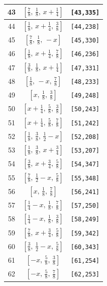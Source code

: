 \documentclass[fleqn,8pt]{jsarticle}
\begin{document}
\begin{longtable}{ccc}
43 & $\left[ \frac{7}{8},\, \frac{1}{8},\, x + \frac{1}{4} \right]$ & {\tt [43,335]} \\ \hline
44 & $\left[ \frac{1}{8},\, x + \frac{1}{4},\, \frac{3}{8} \right]$ & {\tt [44,238]} \\ \hline
45 & $\left[ \frac{7}{8},\, \frac{1}{8},\, - x \right]$ & {\tt [45,330]} \\ \hline
46 & $\left[ \frac{1}{8},\, x + \frac{1}{4},\, \frac{7}{8} \right]$ & {\tt [46,236]} \\ \hline
47 & $\left[ \frac{3}{8},\, \frac{1}{8},\, x + \frac{1}{4} \right]$ & {\tt [47,331]} \\ \hline
48 & $\left[ \frac{1}{8},\, - x,\, \frac{7}{8} \right]$ & {\tt [48,233]} \\ \hline
49 & $\left[ x,\, \frac{1}{8},\, \frac{3}{8} \right]$ & {\tt [49,248]} \\ \hline
50 & $\left[ x + \frac{1}{4},\, \frac{5}{8},\, \frac{3}{8} \right]$ & {\tt [50,243]} \\ \hline
51 & $\left[ x + \frac{1}{4},\, \frac{5}{8},\, \frac{7}{8} \right]$ & {\tt [51,242]} \\ \hline
52 & $\left[ \frac{1}{8},\, \frac{3}{8},\, \frac{1}{2} - x \right]$ & {\tt [52,208]} \\ \hline
53 & $\left[ \frac{1}{8},\, \frac{3}{8},\, x + \frac{3}{4} \right]$ & {\tt [53,207]} \\ \hline
54 & $\left[ \frac{3}{8},\, x + \frac{3}{4},\, \frac{5}{8} \right]$ & {\tt [54,347]} \\ \hline
55 & $\left[ \frac{7}{8},\, \frac{1}{2} - x,\, \frac{5}{8} \right]$ & {\tt [55,348]} \\ \hline
56 & $\left[ x,\, \frac{1}{8},\, \frac{7}{8} \right]$ & {\tt [56,241]} \\ \hline
57 & $\left[ \frac{1}{4} - x,\, \frac{1}{8},\, \frac{7}{8} \right]$ & {\tt [57,250]} \\ \hline
58 & $\left[ \frac{1}{4} - x,\, \frac{1}{8},\, \frac{3}{8} \right]$ & {\tt [58,249]} \\ \hline
59 & $\left[ \frac{7}{8},\, x + \frac{3}{4},\, \frac{5}{8} \right]$ & {\tt [59,342]} \\ \hline
60 & $\left[ \frac{3}{8},\, \frac{1}{2} - x,\, \frac{5}{8} \right]$ & {\tt [60,343]} \\ \hline
61 & $\left[ - x,\, \frac{5}{8},\, \frac{3}{8} \right]$ & {\tt [61,254]} \\ \hline
62 & $\left[ - x,\, \frac{5}{8},\, \frac{7}{8} \right]$ & {\tt [62,253]} \\ \hline

\end{longtable}
\end{document}
